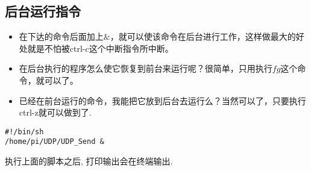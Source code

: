 \subsection{后台运行指令}
\begin{itemize}
    \item 在下达的命令后面加上$\&$，就可以使该命令在后台进行工作，这样做最大的好处就是不怕被ctrl-c这个中断指令所中断。
    \item 在后台执行的程序怎么使它恢复到前台来运行呢？很简单，只用执行$fg$这个命令，就可以了。
    \item 已经在前台运行的命令，我能把它放到后台去运行么？当然可以了，只要执行ctrl-z就可以做到了.
\end{itemize}
\begin{lstlisting}[title=测试脚本]
#!/bin/sh
/home/pi/UDP/UDP_Send &
\end{lstlisting}
执行上面的脚本之后, 打印输出会在终端输出.

